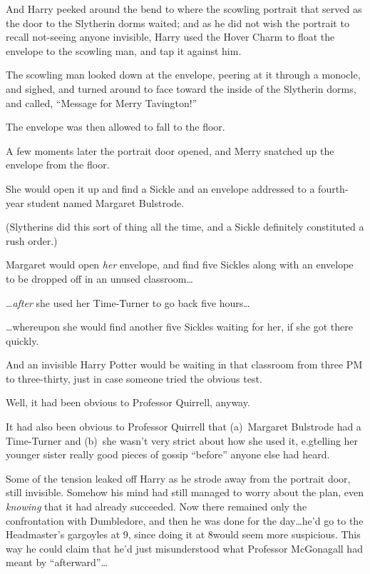 And Harry peeked around the bend to where the scowling portrait that served as the door to the Slytherin dorms waited; and as he did not wish the portrait to recall not-seeing anyone invisible, Harry used the Hover Charm to float the envelope to the scowling man, and tap it against him.

The scowling man looked down at the envelope, peering at it through a monocle, and sighed, and turned around to face toward the inside of the Slytherin dorms, and called, “Message for Merry Tavington!”

The envelope was then allowed to fall to the floor.

A few moments later the portrait door opened, and Merry snatched up the envelope from the floor.

She would open it up and find a Sickle and an envelope addressed to a fourth-year student named Margaret Bulstrode.

(Slytherins did this sort of thing all the time, and a Sickle definitely constituted a rush order.)

Margaret would open \emph{her} envelope, and find five Sickles along with an envelope to be dropped off in an unused classroom…

…\emph{after} she used her Time-Turner to go back five hours…

…whereupon she would find another five Sickles waiting for her, if she got there quickly.

And an invisible Harry Potter would be waiting in that classroom from three PM to three-thirty, just in case someone tried the obvious test.

Well, it had been obvious to Professor Quirrell, anyway.

It had also been obvious to Professor Quirrell that (a)~Margaret Bulstrode had a Time-Turner and (b)~she wasn’t very strict about how she used it, e.g\. telling her younger sister really good pieces of gossip “before” anyone else had heard.

Some of the tension leaked off Harry as he strode away from the portrait door, still invisible. Somehow his mind had still managed to worry about the plan, even \emph{knowing} that it had already succeeded. Now there remained only the confrontation with Dumbledore, and then he was done for the day…he’d go to the Headmaster’s gargoyles at 9\PM, since doing it at 8\PM would seem more suspicious. This way he could claim that he’d just misunderstood what Professor McGonagall had meant by “afterward”…

